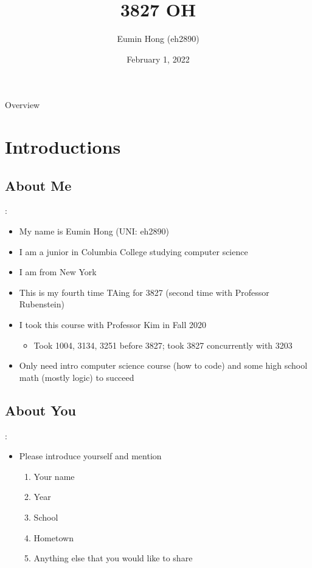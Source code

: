 \documentclass{../slides}
\title{3827 OH}
\author{Eumin Hong (eh2890)}
\institute{Columbia University}
\date{February 1, 2022}
\begin{document}
\begin{frame}
    \titlepage
\end{frame}

\begin{frame}{Overview}
\begin{multicols}{2}
\tableofcontents
\end{multicols}
\end{frame}

\section{Introductions}
\subsection{About Me}
\begin{frame}{\secname: \subsecname}
    \begin{itemize}
        \item My name is Eumin Hong (UNI: eh2890)
        \item I am a junior in Columbia College studying computer science
        \item I am from New York
        \item This is my fourth time TAing for 3827 (second time with Professor Rubenstein)
        \item I took this course with Professor Kim in Fall 2020
        \begin{itemize}
            \item Took 1004, 3134, 3251 before 3827; took 3827 concurrently with 3203
        \end{itemize}
        \item Only need intro computer science course (how to code) and some high school math (mostly logic) to succeed
    \end{itemize}
\end{frame}

\subsection{About You}
\begin{frame}{\secname: \subsecname}
    \begin{itemize}
        \item Please introduce yourself and mention
        \begin{enumerate}
            \item Your name
            \item Year
            \item School
            \item Hometown
            \item Anything else that you would like to share
        \end{enumerate}
    \end{itemize}
\end{frame}
\end{document}
